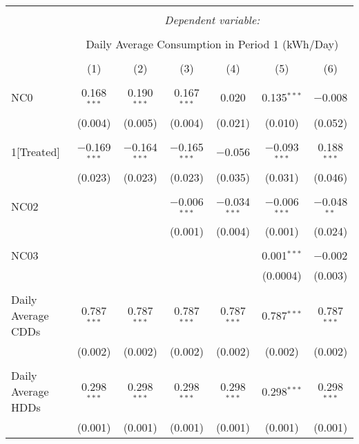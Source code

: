 
\begin{table}[!htbp] \centering 
  \caption{} 
  \label{} 
\small 
\begin{tabular}{@{\extracolsep{5pt}}lcccccc} 
\\[-1.8ex]\hline 
\hline \\[-1.8ex] 
 & \multicolumn{6}{c}{\textit{Dependent variable:}} \\ 
\cline{2-7} 
\\[-1.8ex] & \multicolumn{6}{c}{Daily Average Consumption in Period 1 (kWh/Day)} \\ 
\\[-1.8ex] & (1) & (2) & (3) & (4) & (5) & (6)\\ 
\hline \\[-1.8ex] 
 NC0 & 0.168$^{***}$ & 0.190$^{***}$ & 0.167$^{***}$ & 0.020 & 0.135$^{***}$ & $-$0.008 \\ 
  & (0.004) & (0.005) & (0.004) & (0.021) & (0.010) & (0.052) \\ 
  & & & & & & \\ 
 1[Treated] & $-$0.169$^{***}$ & $-$0.164$^{***}$ & $-$0.165$^{***}$ & $-$0.056 & $-$0.093$^{***}$ & 0.188$^{***}$ \\ 
  & (0.023) & (0.023) & (0.023) & (0.035) & (0.031) & (0.046) \\ 
  & & & & & & \\ 
 NC02 &  &  & $-$0.006$^{***}$ & $-$0.034$^{***}$ & $-$0.006$^{***}$ & $-$0.048$^{**}$ \\ 
  &  &  & (0.001) & (0.004) & (0.001) & (0.024) \\ 
  & & & & & & \\ 
 NC03 &  &  &  &  & 0.001$^{***}$ & $-$0.002 \\ 
  &  &  &  &  & (0.0004) & (0.003) \\ 
  & & & & & & \\ 
 Daily Average CDDs & 0.787$^{***}$ & 0.787$^{***}$ & 0.787$^{***}$ & 0.787$^{***}$ & 0.787$^{***}$ & 0.787$^{***}$ \\ 
  & (0.002) & (0.002) & (0.002) & (0.002) & (0.002) & (0.002) \\ 
  & & & & & & \\ 
 Daily Average HDDs & 0.298$^{***}$ & 0.298$^{***}$ & 0.298$^{***}$ & 0.298$^{***}$ & 0.298$^{***}$ & 0.298$^{***}$ \\ 
  & (0.001) & (0.001) & (0.001) & (0.001) & (0.001) & (0.001) \\ 

\end{tabular}
\end{table}
